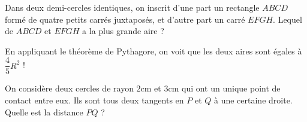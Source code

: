 \begin{exo}
Dans deux demi-cercles identiques, on inscrit d'une part un rectangle $ABCD$ formé de quatre petits carrés juxtaposés, et d'autre part un carré $EFGH$.
Lequel de $ABCD$ et $EFGH$ a la plus grande aire ?

\begin{center}
\hspace{1cm}
\end{center}
\begin{sol}
En appliquant le théorème de Pythagore, on voit que les deux aires sont égales  à $\dfrac 45 R^2$ !
\end{sol}

\end{exo}






\begin{exo}
On considère deux cercles de rayon $2$cm et $3$cm qui ont un unique point de contact entre eux.
Ils sont tous deux tangents en $P$ et $Q$ à une certaine droite.
Quelle est la distance $PQ$ ?
\begin{center}
\end{center}
\begin{hint}
\end{hint}
\begin{sol}
\end{sol}
\end{exo}



